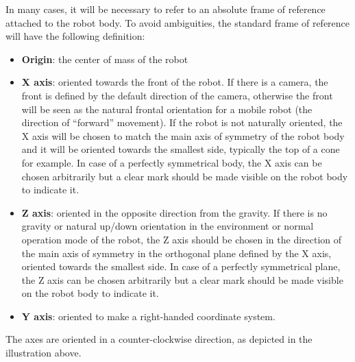 \documentclass[a4paper]{article}
\begin{document}
In many cases, it will be necessary to refer to an absolute frame of
reference attached to the robot body. To avoid ambiguities, the
standard frame of reference will have the following definition:



\begin{figure}

\end{figure}

\begin{itemize}
\item {
\textsf{\textbf{Origin}}\textsf{: the center of mass of the robot}}
\end{itemize}
\begin{itemize}
\item {
\textsf{\textbf{X axis}}\textsf{: oriented towards the front of the
robot. If there is a camera, the front is defined by the default
direction of the camera, otherwise the front will be seen as the
natural frontal orientation for a mobile robot (the direction of
“forward” movement). If the robot is not naturally oriented, the X axis
will be chosen to match the main axis of symmetry of the robot body and
it will be oriented towards the smallest side, typically the top of a
cone for example. }\textsf{In case of a perfectly symmetrical body, the
X axis can be chosen arbitrarily but a clear mark should be made
visible on the robot body to indicate it.}}
\end{itemize}
\begin{itemize}
\item {
\textsf{\textbf{Z axis}}\textsf{: oriented in the opposite direction
from the gravity. If there is no gravity or natural up/down orientation
in the environment or normal operation mode of the robot, the Z axis
should be chosen in the direction of the main axis of symmetry in the
orthogonal plane defined by the X axis, oriented towards the smallest
side. In case of a perfectly symmetrical plane, the Z axis can be
chosen arbitrarily but a clear mark should be made visible on the robot
body to indicate it.}}
\end{itemize}
\begin{itemize}
\item {
\textsf{\textbf{Y axis}}\textsf{: oriented to make a right-handed
coordinate system. }}
\end{itemize}

The axes are oriented in a counter-clockwise direction, as depicted in
the illustration above.
\end{document}
